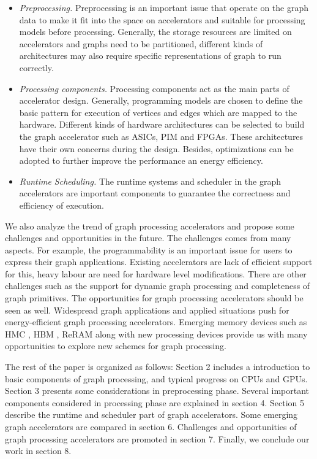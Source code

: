 \documentclass[twoside]{article}
\begin{document}
\begin{multicols}{2}
\begin{itemize}
\item \emph{Preprocessing.}
Preprocessing is an important issue that operate on the graph data to make it fit into the space on accelerators and suitable for processing models before processing. Generally, the storage resources are limited on accelerators and graphs need to be partitioned, different kinds of architectures may also require specific representations of graph to run correctly.

\item \emph{Processing components.}
Processing components act as the main parts of accelerator design. Generally, programming models are chosen to define the basic pattern for execution of vertices and edges which are mapped to the hardware. Different kinds of hardware architectures can be selected to build the graph accelerator such as ASICs, PIM and FPGAs. These architectures have their own concerns during the design. Besides, optimizations can be adopted to further improve the performance an energy efficiency.

\item \emph{Runtime Scheduling.}
The runtime systems and scheduler in the graph accelerators are important components to guarantee the correctness and efficiency of execution. 
\end{itemize}


We also analyze the trend of graph processing accelerators and propose some challenges and opportunities in the future. The challenges comes from many aspects. For example, the programmability is an important issue for users to express their graph applications. Existing accelerators are lack of efficient support for this, heavy labour are need for hardware level modifications. There are other challenges such as the support for dynamic graph processing and completeness of graph primitives. The opportunities for graph processing accelerators should be seen as well. Widespread graph applications and applied situations push for energy-efficient graph processing accelerators. Emerging memory devices such as HMC \cite{hmc}, HBM \cite{hbm}, ReRAM \cite{reram} along with new processing devices provide us with many opportunities to explore new schemes for graph processing.

The rest of the paper is organized as follows: Section 2 includes a introduction to basic components of graph processing, and typical progress on CPUs and GPUs. Section 3 presents some considerations in preprocessing phase. Several important components considered in processing phase are explained in section 4. Section 5 describe the runtime and scheduler part of graph accelerators. Some emerging graph accelerators are compared in section 6.  Challenges and opportunities of graph processing accelerators are promoted in section 7. Finally, we conclude our work in section 8.



\end{multicols}
\end{document}
